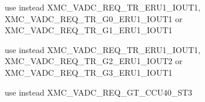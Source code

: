 \begin{DoxyRefList}
%
use instead X\+M\+C\+\_\+\+V\+A\+D\+C\+\_\+\+R\+E\+Q\+\_\+\+T\+R\+\_\+\+E\+R\+U1\+\_\+\+I\+O\+U\+T1, X\+M\+C\+\_\+\+V\+A\+D\+C\+\_\+\+R\+E\+Q\+\_\+\+T\+R\+\_\+\+G0\+\_\+\+E\+R\+U1\+\_\+\+I\+O\+U\+T1 or X\+M\+C\+\_\+\+V\+A\+D\+C\+\_\+\+R\+E\+Q\+\_\+\+T\+R\+\_\+\+G1\+\_\+\+E\+R\+U1\+\_\+\+I\+O\+U\+T1  
\item[Global \mbox{\hyperlink{xmc__vadc__map_8h_a51055798ec24f0fb0dc4470ffa54503c}{X\+M\+C\+\_\+\+E\+R\+U\+\_\+1\+\_\+\+I\+O\+U\+T2}} ]\label{deprecated__deprecated000045}%
%
use instead X\+M\+C\+\_\+\+V\+A\+D\+C\+\_\+\+R\+E\+Q\+\_\+\+T\+R\+\_\+\+E\+R\+U1\+\_\+\+I\+O\+U\+T1, X\+M\+C\+\_\+\+V\+A\+D\+C\+\_\+\+R\+E\+Q\+\_\+\+T\+R\+\_\+\+G2\+\_\+\+E\+R\+U1\+\_\+\+I\+O\+U\+T2 or X\+M\+C\+\_\+\+V\+A\+D\+C\+\_\+\+R\+E\+Q\+\_\+\+T\+R\+\_\+\+G3\+\_\+\+E\+R\+U1\+\_\+\+I\+O\+U\+T1  
\item[Global \mbox{\hyperlink{xmc__vadc__map_8h_a4cad35023f0e0125feaed7ecc384a924}{X\+M\+C\+\_\+\+R\+E\+Q\+\_\+\+G\+T\+\_\+\+S\+EL}} ]\label{deprecated__deprecated000046}%
%
use instead X\+M\+C\+\_\+\+V\+A\+D\+C\+\_\+\+R\+E\+Q\+\_\+\+G\+T\+\_\+\+C\+C\+U40\+\_\+\+S\+T3 
\end{DoxyRefList}